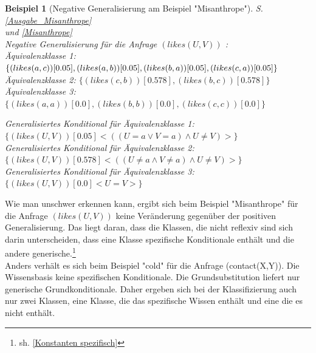 \documentclass[draft]{scrreprt}
\newtheorem{Bsp}{Beispiel}[section]
\begin{document}
\begin{Bsp}[Negative Generalisierung am Beispiel "{}Misanthrope"{}]
	S. \ref{Ausgabe_Misanthrope} \\ und \ref{Misanthrope}\\
	Negative Generalisierung für die Anfrage  $ (likes(U,V))$ :\\
	
	\noindent
	Äquivalenzklasse 1: $ \{(likes(a,c))[0.05], (likes(a,b))[0.05], (likes(b,a))[0.05],\\ (likes(c,a))[0.05]\} $\\
	Äquivalenzklasse 2: $ \{(likes(c,b))[0.578], (likes(b,c))[0.578]\} $\\
	Äquivalenzklasse 3: $ \{ (likes(a,a))[0.0], (likes(b,b))[0.0], (likes(c,c))[0.0]\} $
	
	
	\noindent
		Generalisiertes Konditional für Äquivalenzklasse 1:\\ $ \{(likes(U,V))[0.05] <((U = a \lor V = a) \land U \neq V )>\} $\\
		Generalisiertes Konditional für Äquivalenzklasse 2: \\$ \{(likes(U,V))[0.578] <((U \neq a \land V \neq a) \land U \neq V)>\} $\\	
		Generalisiertes Konditional für Äquivalenzklasse 3:\\ $ \{(likes(U,V))[0.0] <U=V>\} $\\
	\end{Bsp}
Wie man unschwer erkennen kann, ergibt sich beim Beispiel "{}Misanthrope"{} für die Anfrage $ (likes(U,V))$  keine Veränderung gegenüber der positiven Generalisierung. Das liegt daran, dass die Klassen, die nicht reflexiv sind sich darin unterscheiden, dass eine Klasse spezifische Konditionale enthält und die andere generische.\footnote{sh. \ref{Konstanten spezifisch}} \\ 
Anders verhält es sich beim Beispiel "{}cold"{} für die Anfrage (contact(X,Y)). Die Wissensbasis keine spezifischen Konditionale. Die Grundsubstitution liefert nur generische Grundkonditionale. Daher ergeben sich bei der Klassifizierung auch nur zwei Klassen, eine Klasse, die das spezifische Wissen enthält und eine die es nicht enthält.  
\end{document}
